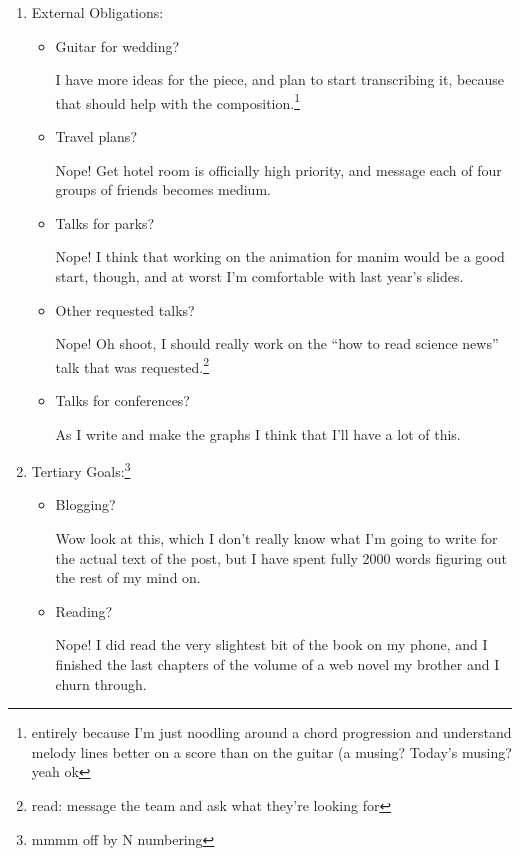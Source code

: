 \documentclass[12pt]{article}
\newcommand{\say}[1]{``#1''}
\renewcommand{\,}{\textsuperscript{,}}
\begin{document}
\begin{enumerate}
\begin{itemize}
\end{itemize}

\item External Obligations:

\begin{itemize}

\item Guitar for wedding?

I have more ideas for the piece, and plan to start transcribing it, because that should help with the composition.\footnote{entirely because I'm just noodling around a chord progression and understand melody lines better on a score than on the guitar (a musing? Today's musing? yeah ok}

\item Travel plans?

Nope! Get hotel room is officially high priority, and message each of four groups of friends becomes medium.

\item Talks for parks?

Nope! I think that working on the animation for manim would be a good start, though, and at worst I'm comfortable with last year's slides.

\item Other requested talks?

Nope! Oh shoot, I should really work on the \say{how to read science news} talk that was requested.\footnote{read: message the team and ask what they're looking for}

\item Talks for conferences?

As I write and make the graphs I think that I'll have a lot of this.

\end{itemize}

\item Tertiary Goals:\footnote{mmmm off by N numbering}

\begin{itemize}

\item Blogging?

Wow look at this, which I don't really know what I'm going to write for the actual text of the post, but I have spent fully 2000 words figuring out the rest of my mind on.

\item Reading?

Nope! I did read the very slightest bit of the book on my phone, and I finished the last chapters of the volume of a web novel my brother and I churn through.


\end{itemize}
\end{enumerate}
\end{document}
